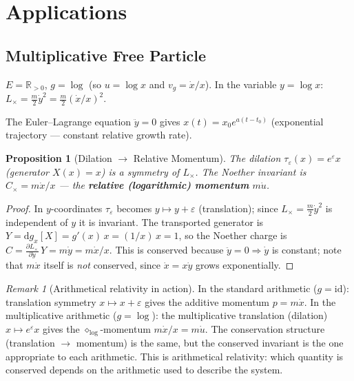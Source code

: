 \documentclass[11pt,twocolumn]{article}
\theoremstyle{plain}
\newtheorem{proposition}[theorem]{Proposition}
\theoremstyle{definition}
\theoremstyle{remark}
\newtheorem{remark}[theorem]{Remark}
\newcommand{\RR}{\mathbb{R}_{>0}}
\newcommand{\dd}{\mathrm{d}}
\begin{document}
\section{Applications}
\label{sec:applications}

\subsection{Multiplicative Free Particle}

$E = \RR$, $g = \log$ (so $u = \log x$ and $v_g = \dot{x}/x$). In the variable $y = \log x$: $L_\times = \frac{m}{2}\dot{y}^2 = \frac{m}{2}(\dot{x}/x)^2$.

The Euler--Lagrange equation $\ddot{y} = 0$ gives $x(t) = x_0 e^{a(t-t_0)}$ (exponential trajectory --- constant relative growth rate).

\begin{proposition}[Dilation $\to$ Relative Momentum]\label{prop:dilation}
The dilation $\tau_\varepsilon(x) = e^\varepsilon x$ (generator $X(x) = x$) is a symmetry of $L_\times$. The Noether invariant is $C_\times = m\dot{x}/x$ --- the \textbf{relative (logarithmic) momentum} $m\dot{u}$.
\end{proposition}

\begin{proof}
In $y$-coordinates $\tau_\varepsilon$ becomes $y \mapsto y + \varepsilon$ (translation); since $L_\times = \frac{m}{2}\dot{y}^2$ is independent of $y$ it is invariant. The transported generator is $Y = \dd g_x[X] = g'(x)\,x = (1/x)\,x = 1$, so the Noether charge is $C = \frac{\partial L_\times}{\partial\dot{y}}\,Y = m\dot{y} = m\dot{x}/x$. This is conserved because $\ddot{y} = 0 \Rightarrow \dot{y}$ is constant; note that $m\dot{x}$ itself is \emph{not} conserved, since $\dot{x} = x\dot{y}$ grows exponentially.
\end{proof}

\begin{remark}[Arithmetical relativity in action]
In the standard arithmetic ($g = \mathrm{id}$): translation symmetry $x \mapsto x + \varepsilon$ gives the additive momentum $p = m\dot{x}$. In the multiplicative arithmetic ($g = \log$): the multiplicative translation (dilation) $x \mapsto e^\varepsilon x$ gives the $\diamond_{\log}$-momentum $m\dot{x}/x = m\dot{u}$. The conservation structure (translation $\to$ momentum) is the same, but the conserved invariant is the one appropriate to each arithmetic. This is arithmetical relativity: which quantity is conserved depends on the arithmetic used to describe the system.
\end{remark}
\end{document}
